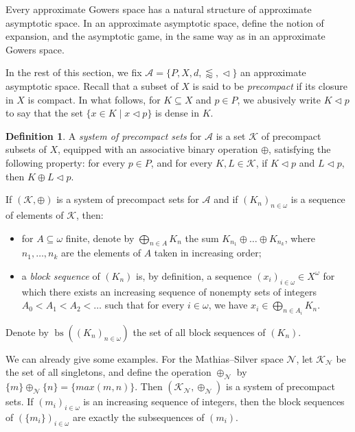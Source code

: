 \documentclass[a4paper,11pt]{article}
\theoremstyle{definition}
\newtheorem{defin}[thm]{Definition}
\numberwithin{equation}{section}
\newcommand{\Sil}{\mathcal{N}}
\newcommand{\A}{\mathcal{A}}
\newcommand{\K}{\mathcal{K}}
\DeclareMathOperator{\bs}{bs}
\begin{document}
Every approximate Gowers space has a natural structure of approximate asymptotic space. In an approximate asymptotic space, define the notion of expansion, and the asymptotic game, in the same way as in an approximate Gowers space.

\smallskip

In the rest of this section, we fix $\A = \{P, X, d, \lessapprox, \vartriangleleft\}$ an approximate asymptotic space. Recall that a subset of $X$ is said to be \emph{precompact} if its closure in $X$ is compact. In what follows, for $K \subseteq X$ and $p \in P$, we abusively write $K \vartriangleleft p$ to say that the set $\{x \in K \mid x \vartriangleleft p\}$ is dense in $K$.

\begin{defin}

A \emph{system of precompact sets} for $\A$ is a set $\mathcal{K}$ of precompact subsets of $X$, equipped with an associative binary operation $\oplus$, satisfying the following property: for every $p \in P$, and for every $K, L \in \mathcal{K}$, if $K \vartriangleleft p$ and $L \vartriangleleft p$, then $K \oplus L \vartriangleleft p$.

\smallskip

If $(\K, \oplus)$ is a system of precompact sets for $\A$ and if $(K_n)_{n \in \omega}$ is a sequence of elements of $\K$, then:

\begin{itemize}

\item for $A \subseteq \omega$ finite, denote by $\bigoplus_{n \in A} K_n$ the sum $K_{n_1} \oplus \ldots \oplus K_{n_k}$, where $n_1, \ldots, n_k$ are the elements of $A$ taken in increasing order;

\item a \emph{block sequence} of $(K_n)$ is,  by definition, a sequence $(x_i)_{i \in \omega} \in X^\omega$ for which there exists an increasing sequence of nonempty sets of integers $A_0 < A_1 < A_2 < \ldots$ such that for every $i \in \omega$, we have $x_i \in \bigoplus_{n \in A_i} K_n$.

\end{itemize}

\noindent Denote by $\bs((K_n)_{n \in \omega})$ the set of all block sequences of $(K_n)$.

\end{defin}

We can already give some examples. For the Mathias--Silver space $\Sil$, let $\K_\Sil$ be the set of all singletons, and define the operation $\oplus_\Sil$ by $\{m\} \oplus_\Sil \{n\} = \{max(m, n)\}$. Then $(\K_\Sil, \oplus_\Sil)$ is a system of precompact sets. If $(m_i)_{i \in \omega}$ is an increasing sequence of integers, then the block sequences of  $(\{m_i\})_{i \in \omega}$ are exactly the subsequences of $(m_i)$.
\end{document}
